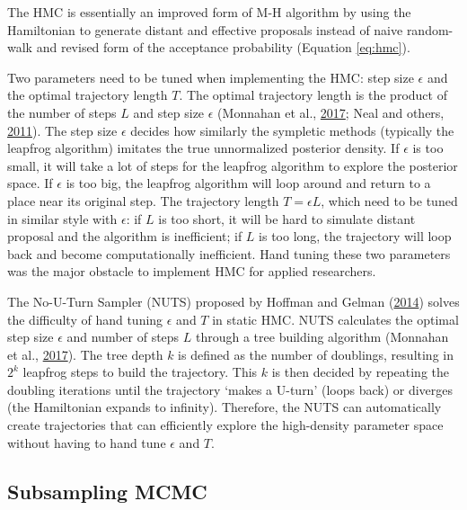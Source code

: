 \documentclass[12pt]{book}
\numberwithin{equation}{chapter}
\begin{document}
The HMC is essentially an improved form of M-H algorithm by using the Hamiltonian to generate distant and effective proposals instead of naive random-walk and revised form of the acceptance probability (Equation \eqref{eq:hmc}).

Two parameters need to be tuned when implementing the HMC: step size \(\epsilon\) and the optimal trajectory length \(T\). The optimal trajectory length is the product of the number of steps \(L\) and step size \(\epsilon\) (Monnahan et al., \protect\hyperlink{ref-monnahan2017faster}{2017}; Neal and others, \protect\hyperlink{ref-neal2011mcmc}{2011}). The step size \(\epsilon\) decides how similarly the sympletic methods (typically the leapfrog algorithm) imitates the true unnormalized posterior density. If \(\epsilon\) is too small, it will take a lot of steps for the leapfrog algorithm to explore the posterior space. If \(\epsilon\) is too big, the leapfrog algorithm will loop around and return to a place near its original step. The trajectory length \(T = \epsilon L\), which need to be tuned in similar style with \(\epsilon\): if \(L\) is too short, it will be hard to simulate distant proposal and the algorithm is inefficient; if \(L\) is too long, the trajectory will loop back and become computationally inefficient. Hand tuning these two parameters was the major obstacle to implement HMC for applied researchers.

The No-U-Turn Sampler (NUTS) proposed by Hoffman and Gelman (\protect\hyperlink{ref-hoffman2014no}{2014}) solves the difficulty of hand tuning \(\epsilon\) and \(T\) in static HMC. NUTS calculates the optimal step size \(\epsilon\) and number of steps \(L\) through a tree building algorithm (Monnahan et al., \protect\hyperlink{ref-monnahan2017faster}{2017}). The tree depth \(k\) is defined as the number of doublings, resulting in \(2^k\) leapfrog steps to build the trajectory. This \(k\) is then decided by repeating the doubling iterations until the trajectory `makes a U-turn' (loops back) or diverges (the Hamiltonian expands to infinity). Therefore, the NUTS can automatically create trajectories that can efficiently explore the high-density parameter space without having to hand tune \(\epsilon\) and \(T\).

\hypertarget{subsampling-mcmc}{%
\subsection{Subsampling MCMC}\label{subsampling-mcmc}}
\end{document}
